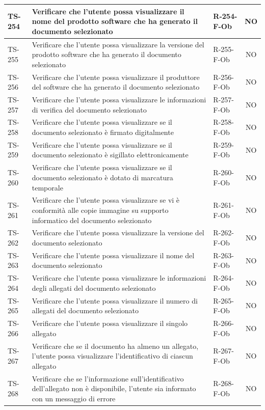\documentclass[a4paper,12pt]{article}
\begin{document}
\begin{longtable}{|p{1.5cm}|p{8.3cm}|p{2.4cm}|c|}
\hline
TS-254 & Verificare che l'utente possa visualizzare il nome del prodotto software che ha generato il documento selezionato & R-254-F-Ob & NO \\
\hline
TS-255 & Verificare che l'utente possa visualizzare la versione del prodotto software che ha generato il documento selezionato & R-255-F-Ob & NO \\
\hline
TS-256 & Verificare che l'utente possa visualizzare il produttore del software che ha generato il documento selezionato & R-256-F-Ob & NO \\
\hline
TS-257 & Verificare che l'utente possa visualizzare le informazioni di verifica del documento selezionato & R-257-F-Ob & NO \\
\hline
TS-258 & Verificare che l'utente possa visualizzare se il documento selezionato è firmato digitalmente & R-258-F-Ob & NO \\
\hline
TS-259 & Verificare che l'utente possa visualizzare se il documento selezionato è sigillato elettronicamente & R-259-F-Ob & NO \\
\hline
TS-260 & Verificare che l'utente possa visualizzare se il documento selezionato è dotato di marcatura temporale & R-260-F-Ob & NO \\
\hline
TS-261 & Verificare che l'utente possa visualizzare se vi è conformità alle copie immagine su supporto informatico del documento selezionato & R-261-F-Ob & NO \\
\hline
TS-262 & Verificare che l'utente possa visualizzare la versione del documento selezionato & R-262-F-Ob & NO \\
\hline
TS-263 & Verificare che l'utente possa visualizzare il nome del documento selezionato & R-263-F-Ob & NO \\
\hline
TS-264 & Verificare che l'utente possa visualizzare le informazioni degli allegati del documento selezionato & R-264-F-Ob & NO \\
\hline
TS-265 & Verificare che l'utente possa visualizzare il numero di allegati del documento selezionato & R-265-F-Ob & NO \\
\hline
TS-266 & Verificare che l'utente possa visualizzare il singolo allegato & R-266-F-Ob & NO \\
\hline
TS-267 & Verificare che se il documento ha almeno un allegato, l'utente possa visualizzare l'identificativo di ciascun allegato & R-267-F-Ob & NO \\
\hline
TS-268 & Verificare che se l'informazione sull'identificativo dell'allegato non è disponibile, l'utente sia informato con un messaggio di errore & R-268-F-Ob & NO \\

\end{longtable}
\end{document}
